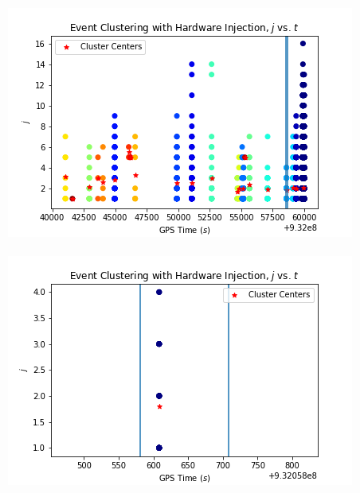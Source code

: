 \documentclass{article}
\begin{document}
\begin{figure}
\begin{subfigure}[t]{0.5\textwidth}
\includegraphics[width=\textwidth]{clusterL1_1.png}
\caption{\label{fig:clusterL1_1}}
\end{subfigure}
\begin{subfigure}[t]{0.5\textwidth}
\includegraphics[width=\textwidth]{clusterzoomL1_1.png}
\caption{\label{fig:clusterzoomL1_2}}
\end{subfigure}


\end{figure}
\end{document}
